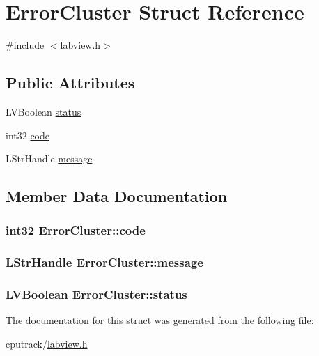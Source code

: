 \hypertarget{struct_error_cluster}{}\section{Error\+Cluster Struct Reference}
\label{struct_error_cluster}


{\ttfamily \#include $<$labview.\+h$>$}

\subsection*{Public Attributes}
\begin{DoxyCompactItemize}
\item 
L\+V\+Boolean \hyperlink{struct_error_cluster_a332d9ef24869985771e4114428871035}{status}
\item 
int32 \hyperlink{struct_error_cluster_afc63e0ed91bc2423b4d6034568c1e55f}{code}
\item 
L\+Str\+Handle \hyperlink{struct_error_cluster_a1352bf4f7aea60ac5d0b873961831260}{message}
\end{DoxyCompactItemize}


\subsection{Member Data Documentation}
\subsubsection[{\texorpdfstring{code}{code}}]{\setlength{\rightskip}{0pt plus 5cm}int32 Error\+Cluster\+::code}\hypertarget{struct_error_cluster_afc63e0ed91bc2423b4d6034568c1e55f}{}\label{struct_error_cluster_afc63e0ed91bc2423b4d6034568c1e55f}
\subsubsection[{\texorpdfstring{message}{message}}]{\setlength{\rightskip}{0pt plus 5cm}L\+Str\+Handle Error\+Cluster\+::message}\hypertarget{struct_error_cluster_a1352bf4f7aea60ac5d0b873961831260}{}\label{struct_error_cluster_a1352bf4f7aea60ac5d0b873961831260}
\subsubsection[{\texorpdfstring{status}{status}}]{\setlength{\rightskip}{0pt plus 5cm}L\+V\+Boolean Error\+Cluster\+::status}\hypertarget{struct_error_cluster_a332d9ef24869985771e4114428871035}{}\label{struct_error_cluster_a332d9ef24869985771e4114428871035}


The documentation for this struct was generated from the following file\+:\begin{DoxyCompactItemize}
\item 
cputrack/\hyperlink{labview_8h}{labview.\+h}\end{DoxyCompactItemize}

